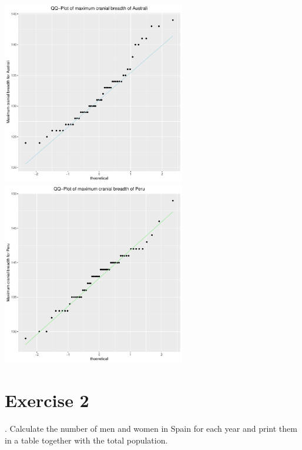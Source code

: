 \documentclass[12pt, oneside]{report}\usepackage[]{graphicx}\usepackage[]{color}
\begin{document}
\begin{Schunk}

\includegraphics[width=8cm,height=8cm]{figure/unnamed-chunk-9-1} \includegraphics[width=8cm,height=8cm]{figure/unnamed-chunk-9-2} \end{Schunk}

\section*{Exercise 2}
. Calculate the number of men and women in Spain for each year and print them in a table together with the total population.
\end{document}

